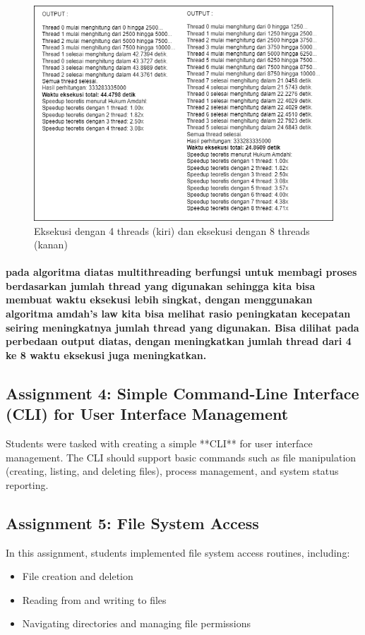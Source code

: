 \documentclass[12pt]{article}
\begin{document}
\begin{figure}[H]
    \centering
    \includegraphics[width=1\linewidth]{asset/31.png}
    \caption{Eksekusi dengan 4 threads (kiri) dan eksekusi dengan 8 threads (kanan)}
\end{figure}

\paragraph{
\hspace*{1cm} pada algoritma diatas multithreading berfungsi untuk membagi proses berdasarkan jumlah thread yang digunakan sehingga kita bisa membuat waktu eksekusi lebih singkat, dengan menggunakan algoritma amdah's law kita bisa melihat rasio peningkatan kecepatan seiring meningkatnya jumlah thread yang digunakan. Bisa dilihat pada perbedaan output diatas, dengan meningkatkan jumlah thread dari 4 ke 8 waktu eksekusi juga meningkatkan. 
}



\subsection{Assignment 4: Simple Command-Line Interface (CLI) for User Interface Management}
Students were tasked with creating a simple **CLI** for user interface management. The CLI should support basic commands such as file manipulation (creating, listing, and deleting files), process management, and system status reporting.

\subsection{Assignment 5: File System Access}
In this assignment, students implemented file system access routines, including:
\begin{itemize}
    \item File creation and deletion
    \item Reading from and writing to files
    \item Navigating directories and managing file permissions
\end{itemize}
\end{document}
